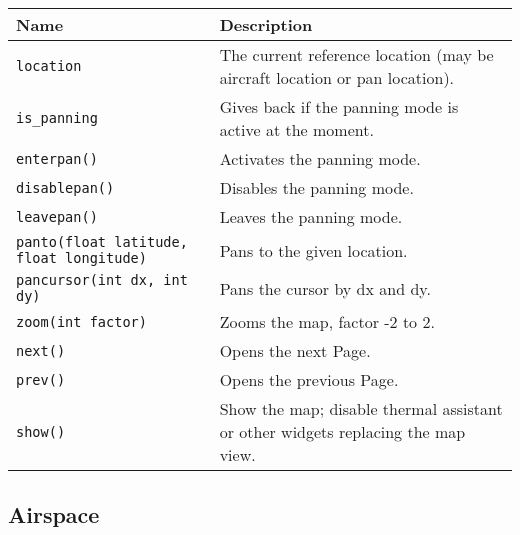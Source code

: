 \begin{maxipage}
\begin{tabularx}{1.9\textwidth}{l|X}
Name & Description \\
\hline\hline

\verb|location| & The current reference location (may be aircraft location or
pan location). \\

\hline

\verb|is_panning| & Gives back if the panning mode is active at the moment.\\

\hline

\verb|enterpan()| & Activates the panning mode.\\

\hline

\verb|disablepan()| & Disables the panning mode.\\

\hline

\verb|leavepan()| & Leaves the panning mode.\\

\hline

\verb|panto(float latitude, float longitude)| & Pans to the given location.\\

\hline

\verb|pancursor(int dx, int dy)| & Pans the cursor by dx and dy. \\

\hline

\verb|zoom(int factor)| & Zooms the map, factor -2 to 2.\\

\hline

\verb|next()| & Opens the next Page.\\

\hline

\verb|prev()| & Opens the previous Page.\\

\hline

\verb|show()| & Show the map; disable thermal assistant or other
widgets replacing the map view. \\

\end{tabularx}
\end{maxipage}

\subsection{Airspace}\label{sec:lua.airspace}

